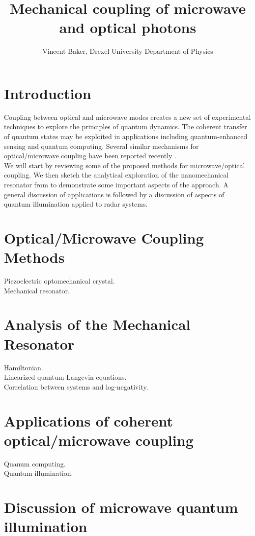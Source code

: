 \documentclass[a4paper,10pt,twocolumn]{article}
\title{Mechanical coupling of microwave and optical photons}
\author{Vincent Baker, Drexel University Department of Physics}
\numberwithin{equation}{section}
\begin{document}
\section{Introduction}
Coupling between optical and microwave modes creates a new set of experimental techniques to explore the principles of quantum dynamics.
The coherent transfer of quantum states may be exploited in applications including quantum-enhanced sensing and quantum computing.
Several similar mechanisms for optical/microwave coupling have been reported recently \cite{nanoCrystal, nanoMR}.\\
We will start by reviewing some of the proposed methods for microwave/optical coupling.
We then sketch the analytical exploration of the nanomechanical resonator from \cite{nanoMR} to demonstrate some important aspects of the approach. 
A general discussion of applications is followed by a discussion of aspects of quantum illumination applied to radar systems.

\section{Optical/Microwave Coupling Methods}
Piezoelectric optomechanical crystal.\\
Mechanical resonator.
\section{Analysis of the Mechanical Resonator}
Hamiltonian.\\
Linearized quantum Langevin equations.\\
Correlation between systems and log-negativity.             
\section{Applications of coherent optical/microwave coupling}
Quanum computing.\\
Quantum illumination.
\section{Discussion of microwave quantum illumination}

\printbibliography
\end{document}
